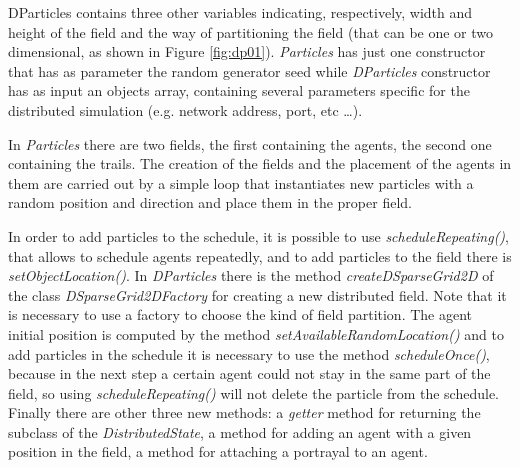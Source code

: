 \documentclass[12pt]{article}
\begin{document}
DParticles contains three other variables indicating, respectively, width and height of the field and the way of partitioning the field (that can be one or two dimensional, as shown in Figure \ref{fig:dp01}). \textit{Particles} has just one constructor that has as parameter the random generator seed while \textit{DParticles} constructor has as input an objects array, containing several parameters specific for the distributed simulation (e.g. network address, port, etc \ldots). 

In \textit{Particles} there are two fields, the first containing the agents, the second one containing the trails. The creation of the fields and the placement of the agents in them are carried out by a simple loop that instantiates new particles with a random position and direction and place them in the proper field. 

In order to add particles to the schedule, it is possible to use \textit{scheduleRepeating()}, that allows to schedule agents repeatedly, and to add particles to the field there is \textit{setObjectLocation()}. In \textit{DParticles} there is the method \textit{createDSparseGrid2D} of the class \textit{DSparseGrid2DFactory} for creating a new distributed field. Note that it is necessary to use a factory to choose the kind of field partition. The agent initial position is computed by the method \textit{setAvailableRandomLocation()} and to add particles in the schedule it is necessary to use the method \textit{scheduleOnce()}, because in the next step a certain agent could not stay in the same part of the field, so using \textit{scheduleRepeating()} will not delete the particle from the schedule. Finally there are other three new methods: a \textit{getter} method for returning the subclass of the \textit{DistributedState}, a method for adding an agent with a given position in the field, a method for attaching a portrayal to an agent.
\end{document}
